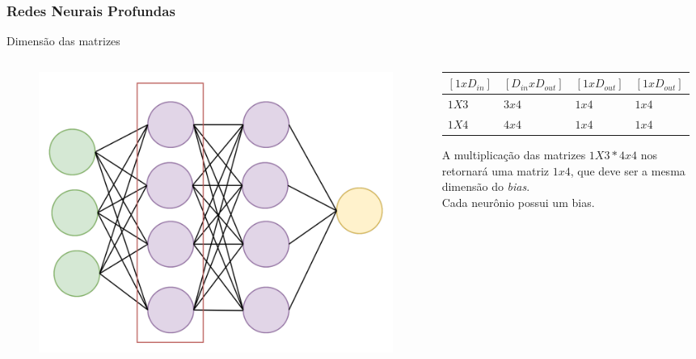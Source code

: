 \documentclass{beamer}
\begin{document}
\begin{frame}
	\frametitle{Redes Neurais Profundas}
	\begin{block}{Dimensão das matrizes}
		\begin{columns}
			\begin{column}{0.4\textwidth}
				\begin{figure}
					\centering
					\includegraphics[width=1\linewidth]{figures/simple_nn2}
				\end{figure}
			\end{column}
			\begin{column}{0.6\textwidth}
				\begin{table}[]
					\begin{tabular}{|l|l|l|l|}
						\hline
						$[1 x D_{in}]$ & $[D_{in} x D_{out}]$ &  $[1x D_{out}]$ & $ [1x D_{out}]$ \\ \hline
						$1X3$ & $3x4$ &  $1x4$ & $1x4$  \\ \hline
						$1X4$ & $4x4$ &  $1x4$ & $1x4$  \\ \hline
					\end{tabular}
				\end{table}
				A multiplicação das matrizes $1X3 * 4x4$ nos retornará uma matriz $1x4$, que deve ser a mesma dimensão do \textit{bias}. \\
				Cada neurônio possui um bias.
			\end{column}
		\end{columns}
		
	\end{block}
\end{frame}
\end{document}
